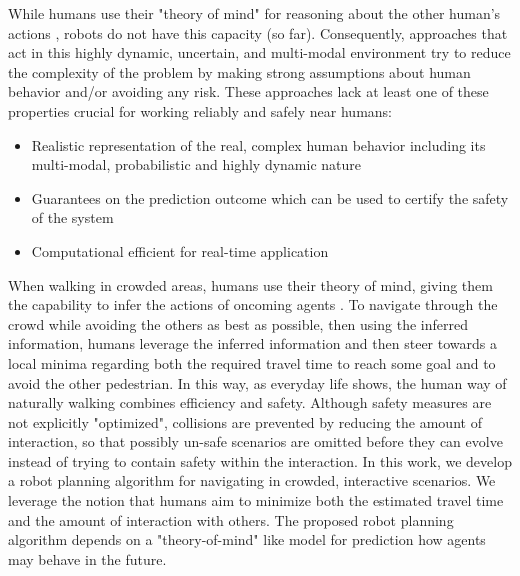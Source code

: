 While humans use their "theory of mind" for reasoning about the other human's actions \cite{Gweon2013}, robots do not have this capacity (so far). Consequently, approaches that act in this highly dynamic, uncertain, and multi-modal environment try to reduce the complexity of the problem by making strong assumptions about human behavior and/or avoiding any risk. These approaches lack at least one of these properties crucial for working reliably and safely near humans: 

\begin{itemize}
\item Realistic representation of the real, complex human behavior including its multi-modal, probabilistic and highly dynamic nature
\item Guarantees on the prediction outcome which can be used to certify the safety of the system
\item Computational efficient for real-time application
\end{itemize}

When walking in crowded areas, humans use their theory of mind, giving them the capability to infer the actions of oncoming agents \cite{Ivanovic2018} \cite{Gweon2013}. To navigate through the crowd while avoiding the others as best as possible, then using the inferred information, humans leverage the inferred information and then steer towards a local minima regarding both the required travel time to reach some goal and to avoid the other pedestrian. In this way, as everyday life shows, the human way of naturally walking combines efficiency and safety. Although safety measures are not explicitly "optimized", collisions are prevented by reducing the amount of interaction, so that possibly un-safe scenarios are omitted before they can evolve instead of trying to contain safety within the interaction. In this work, we develop a robot planning algorithm for navigating in crowded, interactive scenarios. We leverage the notion that humans aim to minimize both the estimated travel time and the amount of interaction with others. The proposed robot planning algorithm depends on a "theory-of-mind" like model for prediction how agents may behave in the future.




